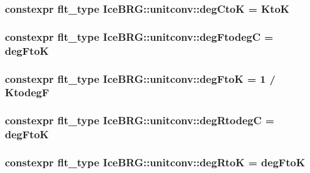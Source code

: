 \subsubsection[{deg\+Cto\+K}]{\setlength{\rightskip}{0pt plus 5cm}constexpr {\bf flt\+\_\+type} Ice\+B\+R\+G\+::unitconv\+::deg\+Cto\+K = {\bf Kto\+K}}\label{namespaceIceBRG_1_1unitconv_a9075e94de0082aeaf9e31c47c732e2e3}
\hypertarget{namespaceIceBRG_1_1unitconv_ae3b3d1da761125b91b9db75f39b5bb7c}{}
\subsubsection[{deg\+Ftodeg\+C}]{\setlength{\rightskip}{0pt plus 5cm}constexpr {\bf flt\+\_\+type} Ice\+B\+R\+G\+::unitconv\+::deg\+Ftodeg\+C = {\bf deg\+Fto\+K}}\label{namespaceIceBRG_1_1unitconv_ae3b3d1da761125b91b9db75f39b5bb7c}
\hypertarget{namespaceIceBRG_1_1unitconv_abaaa687452276185c78d46894b113b92}{}
\subsubsection[{deg\+Fto\+K}]{\setlength{\rightskip}{0pt plus 5cm}constexpr {\bf flt\+\_\+type} Ice\+B\+R\+G\+::unitconv\+::deg\+Fto\+K = 1 / {\bf Ktodeg\+F}}\label{namespaceIceBRG_1_1unitconv_abaaa687452276185c78d46894b113b92}
\hypertarget{namespaceIceBRG_1_1unitconv_a2e9c579a90605f280fd3d9ebec989dc0}{}
\subsubsection[{deg\+Rtodeg\+C}]{\setlength{\rightskip}{0pt plus 5cm}constexpr {\bf flt\+\_\+type} Ice\+B\+R\+G\+::unitconv\+::deg\+Rtodeg\+C = {\bf deg\+Fto\+K}}\label{namespaceIceBRG_1_1unitconv_a2e9c579a90605f280fd3d9ebec989dc0}
\hypertarget{namespaceIceBRG_1_1unitconv_aa18074bff1f7a5aea642acd4d3d9fa07}{}
\subsubsection[{deg\+Rto\+K}]{\setlength{\rightskip}{0pt plus 5cm}constexpr {\bf flt\+\_\+type} Ice\+B\+R\+G\+::unitconv\+::deg\+Rto\+K = {\bf deg\+Fto\+K}}\label{namespaceIceBRG_1_1unitconv_aa18074bff1f7a5aea642acd4d3d9fa07}
\hypertarget{namespaceIceBRG_1_1unitconv_a21a6bd7ae8d55348c171762f6f9603cd}{}
